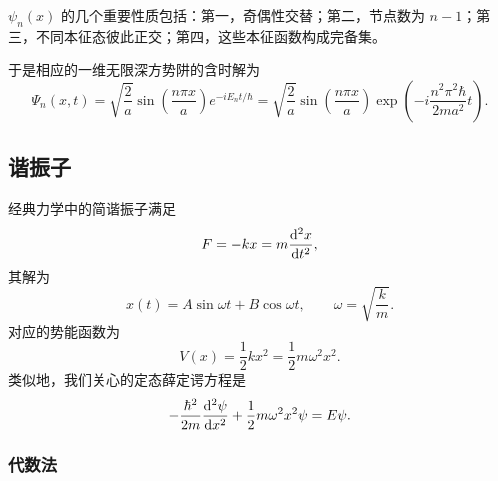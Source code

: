 \(\psi_n(x)\) 的几个重要性质包括：第一，奇偶性交替；第二，节点数为 \(n-1\)；第三，不同本征态彼此正交；第四，这些本征函数构成完备集。

于是相应的一维无限深方势阱的含时解为
\begin{equation}
    \Psi_n(x,t)
    =
    \sqrt{\frac{2}{a}}
    \sin\left( \frac{n\pi x}{a} \right)
    e^{-iE_nt/\hbar}
    =
    \sqrt{\frac{2}{a}}
    \sin\left( \frac{n\pi x}{a} \right)
    \exp\left( -i\frac{n^2\pi^2\hbar}{2ma^2}t \right).
\end{equation}

\subsection{谐振子}

经典力学中的简谐振子满足
\begin{equation}
    F=-kx=m\dv[2]{x}{t},
\end{equation}
其解为
\begin{equation}
    x(t)=A\sin \omega t+B\cos \omega t,
    \qquad
    \omega=\sqrt{\frac{k}{m}}.
\end{equation}
对应的势能函数为
\begin{equation}
    V(x)=\frac{1}{2}kx^2=\frac{1}{2}m\omega^2x^2.
\end{equation}
类似地，我们关心的定态薛定谔方程是
\begin{equation}
    -\frac{\hbar^2}{2m}\dv[2]{\psi}{x}
    +\frac{1}{2}m\omega^2x^2\psi
    =E\psi.
\end{equation}

\subsubsection{代数法}


